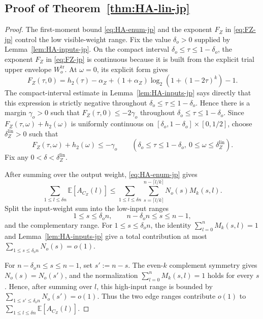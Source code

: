 \documentclass[11pt]{article}
\theoremstyle{definition}
\newcommand{\EE}{\mathbb E}
\newcommand{\h}{h_2}
\newcommand{\CZ}{C_Z}
\begin{document}
\subsection{Proof of Theorem~\ref{thm:HA-lin-jp}}

\begin{proof}
The first-moment bound \eqref{eq:HA-enum-jp} and the exponent \(F_Z\) in \eqref{eq:FZ-jp} control the low visible-weight range.
Fix the value \(\delta_o>0\) supplied by Lemma~\ref{lem:HA-inputs-jp}.
On the compact interval
\(\delta_o\le\tau\le1-\delta_o\), the exponent \(F_Z\) in \eqref{eq:FZ-jp} is continuous because it is built from the explicit trial upper envelope \(W_o^{\mathrm{tr}}\).
At \(\omega=0\), its explicit form gives
\[
F_Z(\tau,0)
=
\h(\tau)-\alpha_Z
+(1+\alpha_Z)\log_2\!\left(1+(1-2\tau)^k\right)-1.
\]
The compact-interval estimate in Lemma~\ref{lem:HA-inputs-jp} says directly
that this expression is strictly negative throughout
\(\delta_o\le\tau\le1-\delta_o\). Hence there is a margin
\(\gamma_o>0\) such that \(F_Z(\tau,0)\le-2\gamma_o\) throughout
\(\delta_o\le\tau\le1-\delta_o\). Since \(F_Z(\tau,\omega)+\h(\omega)\) is uniformly continuous on
\([\delta_o,1-\delta_o]\times[0,1/2]\), choose
\(\delta_Z^{\mathrm{lin}}>0\) such that
\begin{equation*}
F_Z(\tau,\omega)+\h(\omega)\le-\gamma_o
\qquad
(\delta_o\le\tau\le1-\delta_o,\ 0\le\omega\le\delta_Z^{\mathrm{lin}}).
\end{equation*}
Fix any \(0<\delta<\delta_Z^{\mathrm{lin}}\).

After summing over the output weight, \eqref{eq:HA-enum-jp} gives
\begin{equation*}
\sum_{1\le l\le \delta n}\EE[A_{\CZ}(l)]
\le
\sum_{1\le l\le \delta n}
\sum_{s=\lceil l/k\rceil}^{n-\lceil l/k\rceil}
N_o(s)M_k(s,l).
\end{equation*}
Split the input-weight sum into the low-input ranges
\[
1\le s\le \delta_o n,
\qquad
n-\delta_o n\le s\le n-1,
\]
and the complementary range. For \(1\le s\le\delta_o n\), the identity
\(\sum_{l=0}^n M_k(s,l)=1\) and Lemma~\ref{lem:HA-inputs-jp} give a total contribution at most
\(\sum_{1\le s\le\delta_o n}N_o(s)=o(1)\).

For \(n-\delta_o n\le s\le n-1\), set \(s':=n-s\). The even-\(k\) complement symmetry gives \(N_o(s)=N_o(s')\), and the normalization \(\sum_{l=0}^n M_k(s,l)=1\) holds for every \(s\). Hence, after summing over \(l\), this high-input range is bounded by
\(\sum_{1\le s'\le\delta_o n}N_o(s')=o(1)\). Thus the two edge ranges contribute \(o(1)\) to
\(\sum_{1\le l\le \delta n}\EE[A_{\CZ}(l)]\).


\end{proof}
\end{document}
